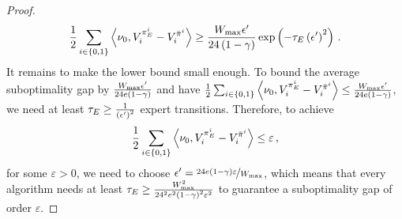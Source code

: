 \begin{proof}
    \begin{equation*}
        \frac12 \sum_{i \in \left\{ 0, 1 \right\}} \left\langle \nu_0, V_i^{\pi_E^i} - V_i^{\bar\pi^i} \right\rangle \geq \frac{W_{\max} \epsilon'}{24 \left( 1 - \gamma \right)} \exp \left( - \tau_E \left( \epsilon' \right)^2 \right)\,.
    \end{equation*}
    It remains to make the lower bound small enough. To bound the average suboptimality gap by $\frac{W_{\max} \epsilon'}{24 e \left( 1 - \gamma \right)}$ and have $\frac12 \sum_{i \in \left\{ 0, 1 \right\}} \left\langle \nu_0, V_i^{\pi_E^i} - V_i^{\bar\pi^i} \right\rangle \leq \frac{W_{\max} \epsilon'}{24 e \left( 1 - \gamma \right)}$, we need at least $\tau_E \geq \frac{1}{\left( \epsilon' \right)^2}$ expert transitions. Therefore, to achieve
    \begin{equation*}
        \frac12 \sum_{i \in \left\{ 0, 1 \right\}} \left\langle \nu_0, V_i^{\pi_E^i} - V_i^{\bar\pi^i} \right\rangle \leq \varepsilon\,,
    \end{equation*}
    for some $\varepsilon > 0$, we need to choose $\epsilon' = \nicefrac{24 e \left( 1 - \gamma \right) \varepsilon}{W_{\max}}$, which means that every algorithm needs at least $\tau_E \geq \frac{W_{\max}^2}{24^2 e^2 \left( 1 - \gamma \right)^2 \varepsilon^2}$ to guarantee a suboptimality gap of order $\varepsilon$.
\end{proof}
